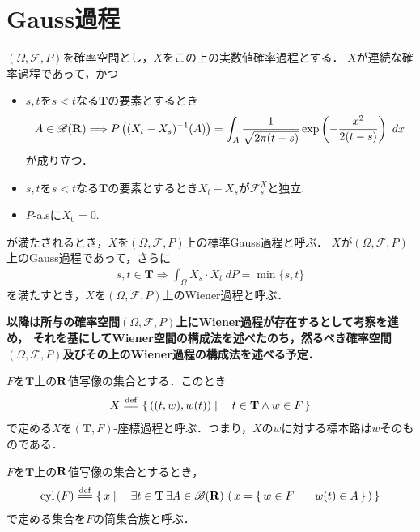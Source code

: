 \section{Gauss過程}
	$(\Omega,\mathscr{F},P)$を確率空間とし，$X$をこの上の実数値確率過程とする．
	$X$が連続な確率過程であって，かつ
	\begin{itemize}
		\item $s,t$を$s < t$なる$\mathbf{T}$の要素とするとき
			\begin{align}
				A \in \mathscr{B}(\mathbf{R}) \Longrightarrow
				P\left((X_t-X_s)^{-1}(A)\right)
				= \int_A \frac{1}{\sqrt{2\pi(t-s)}} \exp\left(-\frac{x^2}{2(t-s)}\right)\ dx
			\end{align}
			が成り立つ．
		
		\item $s,t$を$s < t$なる$\mathbf{T}$の要素とするとき$X_t - X_s$が$\mathscr{F}^X_s$と独立.
			
		\item $P$-a.sに$X_0 = 0$.
	\end{itemize}
	が満たされるとき，$X$を$(\Omega,\mathscr{F},P)$上の標準Gauss過程と呼ぶ．
	$X$が$(\Omega,\mathscr{F},P)$上のGauss過程であって，さらに
	\begin{align}
		s,t \in \mathbf{T} \Longrightarrow \int_\Omega X_s \cdot X_t\ dP = \min{\{s,t\}}
	\end{align}
	を満たすとき，$X$を$(\Omega,\mathscr{F},P)$上のWiener過程と呼ぶ．
	
	{\bf 以降は所与の確率空間$(\Omega,\mathscr{F},P)$上にWiener過程が存在するとして考察を進め，
	それを基にしてWiener空間の構成法を述べたのち，然るべき確率空間$(\Omega,\mathscr{F},P)$及びその上のWiener過程の構成法を述べる予定．}
	
	\begin{screen}
		\begin{dfn}[座標過程]
			$F$を$\mathbf{T}$上の$\mathbf{R}$値写像の集合とする．このとき
			\begin{align}
				X \defeq \Set{((t,w),w(t))}{t \in \mathbf{T} \wedge w \in F}
			\end{align}
			で定める$X$を$(\mathbf{T},F)$-座標過程と呼ぶ．つまり，$X$の$w$に対する標本路は$w$そのものである．
		\end{dfn}
	\end{screen}
	
	\begin{screen}
		\begin{dfn}[筒集合]
			$F$を$\mathbf{T}$上の$\mathbf{R}$値写像の集合とするとき，
			\begin{align}
				\cyl{F} \defeq 
				\Set{x}{\exists t \in \mathbf{T}\, \exists A \in \borel{\R}\, 
				\left(\, x = \Set{w \in F}{w(t) \in A}\, \right)}
			\end{align}
			で定める集合を$F$の筒集合族と呼ぶ．
		\end{dfn}
	\end{screen}
	
